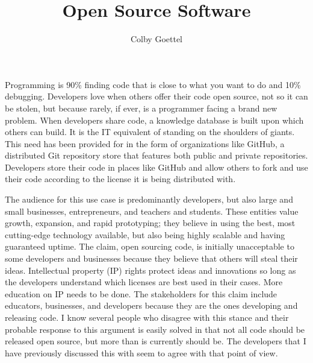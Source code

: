 \documentclass[12pt]{article}
\title{Open Source Software}
\author{Colby Goettel}
\begin{document}
\maketitle



Programming is 90\% finding code that is close to what you want to do and 10\% debugging. Developers love when others offer their code open source, not so it can be stolen, but because rarely, if ever, is a programmer facing a brand new problem. When developers share code, a knowledge database is built upon which others can build. It is the IT equivalent of standing on the shoulders of giants. This need has been provided for in the form of organizations like GitHub, a distributed Git repository store that features both public and private repositories. Developers store their code in places like GitHub and allow others to fork and use their code according to the license it is being distributed with.

The audience for this use case is predominantly developers, but also large and small businesses, entrepreneurs, and teachers and students. These entities value growth, expansion, and rapid prototyping; they believe in using the best, most cutting-edge technology available, but also being highly scalable and having guaranteed uptime. The claim, open sourcing code, is initially unacceptable to some developers and businesses because they believe that others will steal their ideas. Intellectual property (IP) rights protect ideas and innovations so long as the developers understand which licenses are best used in their cases. More education on IP needs to be done. The stakeholders for this claim include educators, businesses, and developers because they are the ones developing and releasing code. I know several people who disagree with this stance and their probable response to this argument is easily solved in that not all code should be released open source, but more than is currently should be. The developers that I have previously discussed this with seem to agree with that point of view.
\end{document}

